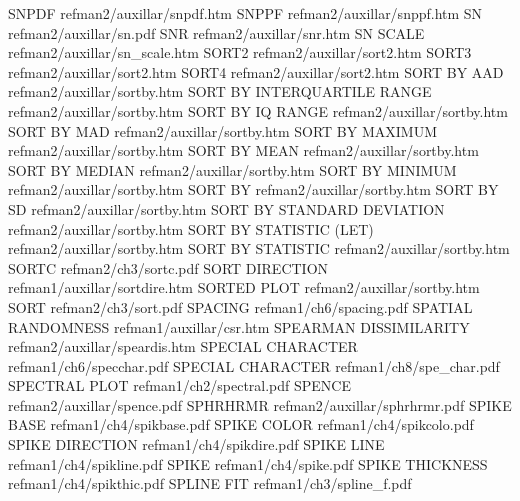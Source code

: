 SNPDF                                   refman2/auxillar/snpdf.htm
SNPPF                                   refman2/auxillar/snppf.htm
SN                                      refman2/auxillar/sn.pdf
SNR                                     refman2/auxillar/snr.htm
SN SCALE                                refman2/auxillar/sn_scale.htm
SORT2                                   refman2/auxillar/sort2.htm
SORT3                                   refman2/auxillar/sort2.htm
SORT4                                   refman2/auxillar/sort2.htm
SORT BY AAD                             refman2/auxillar/sortby.htm
SORT BY INTERQUARTILE RANGE             refman2/auxillar/sortby.htm
SORT BY IQ RANGE                        refman2/auxillar/sortby.htm
SORT BY MAD                             refman2/auxillar/sortby.htm
SORT BY MAXIMUM                         refman2/auxillar/sortby.htm
SORT BY MEAN                            refman2/auxillar/sortby.htm
SORT BY MEDIAN                          refman2/auxillar/sortby.htm
SORT BY MINIMUM                         refman2/auxillar/sortby.htm
SORT BY                                 refman2/auxillar/sortby.htm
SORT BY SD                              refman2/auxillar/sortby.htm
SORT BY STANDARD DEVIATION              refman2/auxillar/sortby.htm
SORT BY STATISTIC (LET)                 refman2/auxillar/sortby.htm
SORT BY STATISTIC                       refman2/auxillar/sortby.htm
SORTC                                   refman2/ch3/sortc.pdf
SORT DIRECTION                          refman1/auxillar/sortdire.htm
SORTED PLOT                             refman2/auxillar/sortby.htm
SORT                                    refman2/ch3/sort.pdf
SPACING                                 refman1/ch6/spacing.pdf
SPATIAL RANDOMNESS                      refman1/auxillar/csr.htm
SPEARMAN DISSIMILARITY                  refman2/auxillar/speardis.htm
SPECIAL CHARACTER                       refman1/ch6/specchar.pdf
SPECIAL CHARACTER                       refman1/ch8/spe_char.pdf
SPECTRAL PLOT                           refman1/ch2/spectral.pdf
SPENCE                                  refman2/auxillar/spence.pdf
SPHRHRMR                                refman2/auxillar/sphrhrmr.pdf
SPIKE BASE                              refman1/ch4/spikbase.pdf
SPIKE COLOR                             refman1/ch4/spikcolo.pdf
SPIKE DIRECTION                         refman1/ch4/spikdire.pdf
SPIKE LINE                              refman1/ch4/spikline.pdf
SPIKE                                   refman1/ch4/spike.pdf
SPIKE THICKNESS                         refman1/ch4/spikthic.pdf
SPLINE FIT                              refman1/ch3/spline_f.pdf
